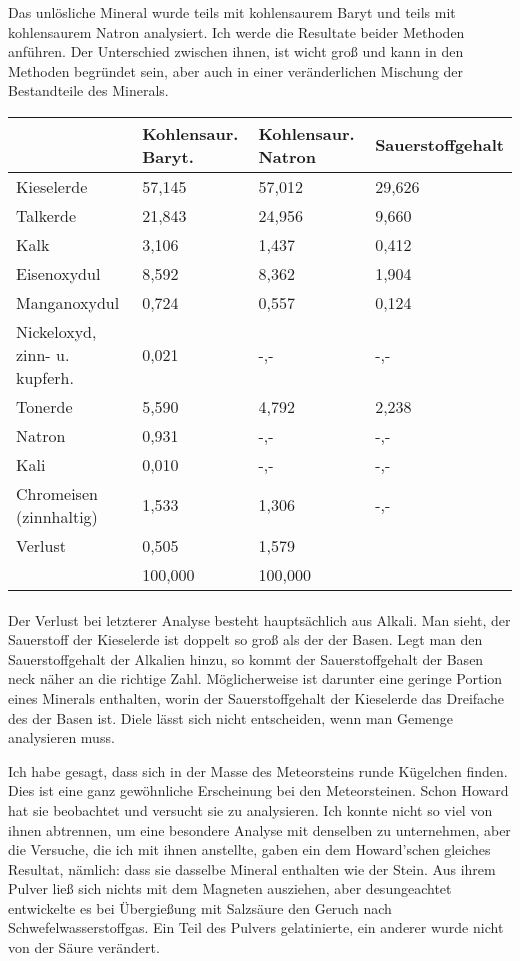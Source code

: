 \documentclass[a4paper, 11pt, oneside]{article}
\begin{document}
Das unlösliche Mineral wurde teils mit kohlensaurem Baryt und teils mit kohlensaurem Natron analysiert. Ich werde die Resultate beider Methoden anführen. Der Unterschied zwischen ihnen, ist wicht groß und kann in den Methoden begründet sein, aber auch in einer veränderlichen Mischung der Bestandteile des Minerals.
\begin{center}
\begin{tabular}{ |p{30mm}|p{18mm}|p{18mm}|p{24mm}| }
    \hline
      & Kohlensaur. Baryt. & Kohlensaur. Natron & Sauerstoffgehalt\\\hline
    Kieselerde & 57,145 & 57,012 & 29,626\\\hline
    Talkerde & 21,843 & 24,956 & 9,660\\\hline
    Kalk & 3,106 & 1,437 & 0,412\\\hline
    Eisenoxydul & 8,592 & 8,362 & 1,904\\\hline
    Manganoxydul & 0,724 & 0,557  & 0,124\\\hline
    Nickeloxyd, zinn- u. kupferh. & 0,021  & -,-  & -,-\\\hline
    Tonerde & 5,590 & 4,792 & 2,238\\\hline
    Natron & 0,931 & -,- & -,-\\\hline
    Kali & 0,010 & -,-  & -,-\\\hline
    Chromeisen (zinnhaltig) & 1,533 & 1,306 & -,-\\\hline
    Verlust & 0,505 & 1,579 & \\\hline
     & 100,000 & 100,000 & \\
    \hline
\end{tabular}
\end{center}
\paragraph{}
Der Verlust bei letzterer Analyse besteht hauptsächlich aus Alkali. Man sieht, der Sauerstoff der Kieselerde ist doppelt so groß als der der Basen. Legt man den Sauerstoffgehalt der Alkalien hinzu, so kommt der Sauerstoffgehalt der Basen neck näher an die richtige Zahl. Möglicherweise ist darunter eine geringe Portion eines Minerals enthalten, worin der Sauerstoffgehalt der Kieselerde das Dreifache des der Basen ist. Diele lässt sich nicht entscheiden, wenn man Gemenge analysieren muss.

Ich habe gesagt, dass sich in der Masse des Meteorsteins runde Kügelchen finden. Dies ist eine ganz gewöhnliche Erscheinung bei den Meteorsteinen. Schon Howard hat sie beobachtet und versucht sie zu analysieren. Ich konnte nicht so viel von ihnen abtrennen, um eine besondere Analyse mit denselben zu unternehmen, aber die Versuche, die ich mit ihnen anstellte, gaben ein dem Howard'schen gleiches Resultat, nämlich: dass sie dasselbe Mineral enthalten wie der Stein. Aus ihrem Pulver ließ sich nichts mit dem Magneten ausziehen, aber desungeachtet entwickelte es bei Übergießung mit Salzsäure den Geruch nach Schwefelwasserstoffgas. Ein Teil des Pulvers gelatinierte, ein anderer wurde nicht von der Säure verändert.
\end{document}
